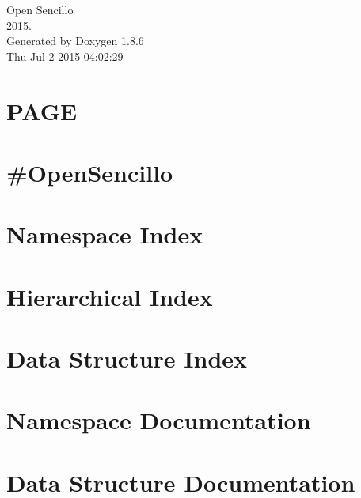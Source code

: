 \documentclass[twoside]{book}
\newcommand{\clearemptydoublepage}{%
  \newpage{\pagestyle{empty}\cleardoublepage}%
}
\begin{document}
\hypersetup{pageanchor=false}
\begin{titlepage}
\vspace*{7cm}
\begin{center}%
{\Large Open Sencillo \\[1ex]\large 2015. }\\
\vspace*{1cm}
{\large Generated by Doxygen 1.8.6}\\
\vspace*{0.5cm}
{\small Thu Jul 2 2015 04:02:29}\\
\end{center}
\end{titlepage}
\clearemptydoublepage
\tableofcontents
\clearemptydoublepage
{}
\hypersetup{pageanchor=true}

\chapter{P\-A\-G\-E}
\label{string}
\hypertarget{string}{}

\chapter{\#Open\-Sencillo}
\label{md__home_peter_git__open_sencillo__r_e_a_d_m_e}
\hypertarget{md__home_peter_git__open_sencillo__r_e_a_d_m_e}{}

\chapter{Namespace Index}

\chapter{Hierarchical Index}

\chapter{Data Structure Index}

\chapter{Namespace Documentation}

\chapter{Data Structure Documentation}
































\end{document}
